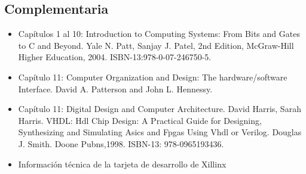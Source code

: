 \documentclass[11pt]{article}
\begin{document}
\subsection*{Complementaria}

\begin{itemize}
\item Capítulos 1 al 10: Introduction to Computing Systems: From Bits and Gates to C and Beyond. Yale N. Patt, Sanjay J. Patel, 2nd Edition, McGraw-Hill Higher Education, 2004. ISBN-13:978-0-07-246750-5. \item Capítulo 11: Computer Organization and Design: The hardware/software Interface. David A. Patterson and John L. Hennessy. \item Capítulo 11: Digital Design and Computer Architecture. David Harris, Sarah Harris. VHDL: Hdl Chip Design: A Practical Guide for Designing, Synthesizing and Simulating Asics and Fpgas Using Vhdl or Verilog. Douglas J. Smith. Doone Pubns,1998. ISBN-13: 978-0965193436. \item Información técnica de la tarjeta de desarrollo de Xillinx
\end{itemize}
\end{document}
